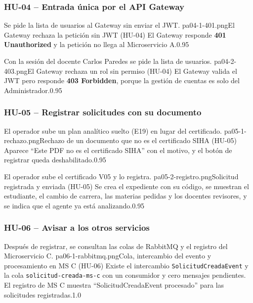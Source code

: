 \subsubsection{HU-04 -- Entrada única por el API Gateway}

{Se pide la lista de usuarios al Gateway sin enviar el JWT.}
{pa04-1-401.png}{El Gateway rechaza la petición sin JWT (HU-04)}
{El Gateway responde \textbf{401 Unauthorized} y la petición no llega al Microservicio A.}{0.95}

{Con la sesión del docente Carlos Paredes se pide la lista de usuarios.}
{pa04-2-403.png}{El Gateway rechaza un rol sin permiso (HU-04)}
{El Gateway valida el JWT pero responde \textbf{403 Forbidden}, porque la gestión de cuentas es solo del Administrador.}{0.95}

\subsubsection{HU-05 -- Registrar solicitudes con su documento}

{El operador sube un plan analítico suelto (E19) en lugar del certificado.}
{pa05-1-rechazo.png}{Rechazo de un documento que no es el certificado SIHA (HU-05)}
{Aparece ``Este PDF no es el certificado SIHA'' con el motivo, y el botón de registrar queda deshabilitado.}{0.95}

{El operador sube el certificado V05 y lo registra.}
{pa05-2-registro.png}{Solicitud registrada y enviada (HU-05)}
{Se crea el expediente con su código, se muestran el estudiante, el cambio de carrera, las materias pedidas y los
docentes revisores, y se indica que el agente ya está analizando.}{0.95}

\subsubsection{HU-06 -- Avisar a los otros servicios}

{Después de registrar, se consultan las colas de RabbitMQ y el registro del Microservicio C.}
{pa06-1-rabbitmq.png}{Cola, intercambio del evento y procesamiento en MS C (HU-06)}
{Existe el intercambio \texttt{SolicitudCreadaEvent} y la cola \texttt{solicitud-creada-ms-c} con un consumidor y cero
mensajes pendientes. El registro de MS C muestra ``SolicitudCreadaEvent procesado'' para las solicitudes registradas.}{1.0}

